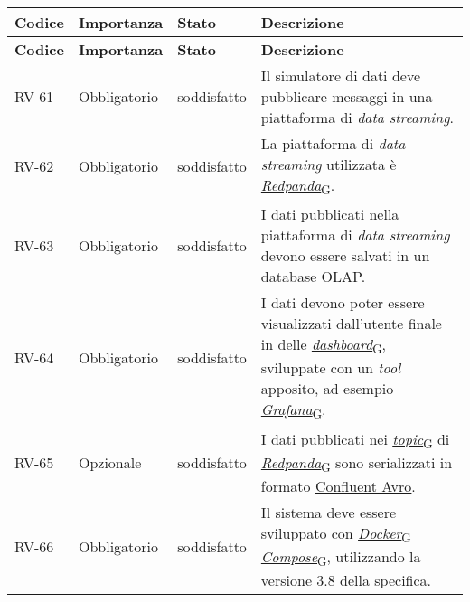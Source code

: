 \begin{longtable}{|>{\centering\arraybackslash}m{}|>{\centering\arraybackslash}m{}|>{\centering\arraybackslash}m{}|>{\centering\arraybackslash}m{}|}
	\hline
	\textbf{Codice} & \textbf{Importanza} & \textbf{Stato}& \textbf{Descrizione}\\\hline
	\endfirsthead
	\hline
	\textbf{Codice} & \textbf{Importanza} & \textbf{Stato}& \textbf{Descrizione}\\\hline
	\endhead
	\hline
	RV-61           & Obbligatorio        & soddisfatto & Il simulatore di dati deve pubblicare messaggi in una piattaforma di \textit{data streaming}.
	\\\hline
	RV-62           & Obbligatorio        & soddisfatto                                                                                                           & La piattaforma di \textit{data streaming} utilizzata è \href{https://7last.github.io/docs/pb/documentazione-interna/glossario\#redpanda}{\textit{Redpanda}\textsubscript{G}}.
	\\\hline
	RV-63           & Obbligatorio        & soddisfatto & I dati pubblicati nella piattaforma di \textit{data streaming} devono essere salvati in un database OLAP.
	\\\hline
	RV-64           & Obbligatorio        & soddisfatto & I dati devono poter essere visualizzati dall'utente finale in delle \href{https://7last.github.io/docs/pb/documentazione-interna/glossario\#dashboard}{\textit{dashboard}\textsubscript{G}}, sviluppate con un \textit{tool} apposito, ad esempio \href{https://7last.github.io/docs/pb/documentazione-interna/glossario\#grafana}{\textit{Grafana}\textsubscript{G}}.
	\\\hline
	RV-65           & Opzionale           & soddisfatto                                                                                                           & I dati pubblicati nei \href{https://7last.github.io/docs/pb/documentazione-interna/glossario\#topic}{\textit{topic}\textsubscript{G}} di \href{https://7last.github.io/docs/pb/documentazione-interna/glossario\#redpanda}{\textit{Redpanda}\textsubscript{G}} sono serializzati in formato \href{https://docs.confluent.io/platform/current/schema-registry/fundamentals/serdes-develop/serdes-avro.html}{\underline{Confluent Avro}}.
	\\\hline
	RV-66           & Obbligatorio        & soddisfatto                                                                                                           & Il sistema deve essere sviluppato con \href{https://7last.github.io/docs/pb/documentazione-interna/glossario\#docker-compose}{\href{https://7last.github.io/docs/pb/documentazione-interna/glossario\#docker}{\textit{Docker}\textsubscript{G}}\textit{ Compose}\textsubscript{G}}, utilizzando la versione 3.8 della specifica.

\end{longtable}
